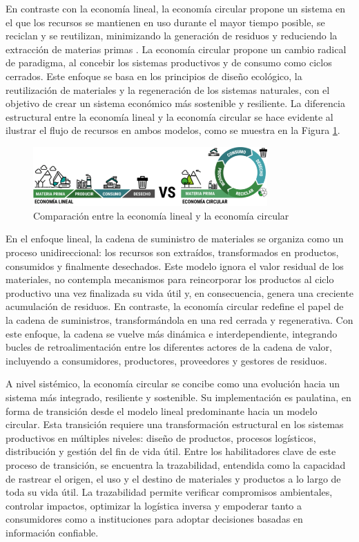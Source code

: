 En contraste con la economía lineal, la economía circular propone un sistema en el que los recursos se mantienen en uso durante el mayor tiempo posible, se reciclan y se reutilizan, minimizando la generación de residuos y reduciendo la extracción de materias primas \cite{ellenmacarthurfoundation2022}. La economía circular propone un cambio radical de paradigma, al concebir los sistemas productivos y de consumo como ciclos cerrados. Este enfoque se basa en los principios de diseño ecológico, la reutilización de materiales y la regeneración de los sistemas naturales, con el objetivo de crear un sistema económico más sostenible y resiliente. La diferencia estructural entre la economía lineal y la economía circular se hace evidente al ilustrar el flujo de recursos en ambos modelos, como se muestra en la Figura \ref{fig:circular-linear-economy-comparison}.

\begin{figure}[!htpb]
    \centering
    \includegraphics[width=0.8\textwidth]{Figures/circular-linear-economy-comparison.png}
    \caption{Comparación entre la economía lineal y la economía circular}
    \label{fig:circular-linear-economy-comparison}
\end{figure}

En el enfoque lineal, la cadena de suministro de materiales se organiza como un proceso unidireccional: los recursos son extraídos, transformados en productos, consumidos y finalmente desechados. Este modelo ignora el valor residual de los materiales, no contempla mecanismos para reincorporar los productos al ciclo productivo una vez finalizada su vida útil y, en consecuencia, genera una creciente acumulación de residuos. En contraste, la economía circular redefine el papel de la cadena de suministros, transformándola en una red cerrada y regenerativa. Con este enfoque, la cadena se vuelve más dinámica e interdependiente, integrando bucles de retroalimentación entre los diferentes actores de la cadena de valor, incluyendo a consumidores, productores, proveedores y gestores de residuos. 

A nivel sistémico, la economía circular se concibe como una evolución hacia un sistema más integrado, resiliente y sostenible. Su implementación es paulatina, en forma de transición desde el modelo lineal predominante hacia un modelo circular. Esta transición requiere una transformación estructural en los sistemas productivos en múltiples niveles: diseño de productos, procesos logísticos, distribución y gestión del fin de vida útil. Entre los habilitadores clave de este proceso de transición, se encuentra la trazabilidad, entendida como la capacidad de rastrear el origen, el uso y el destino de materiales y productos a lo largo de toda su vida útil. La trazabilidad permite verificar compromisos ambientales, controlar impactos, optimizar la logística inversa y empoderar tanto a consumidores como a instituciones para adoptar decisiones basadas en información confiable.

